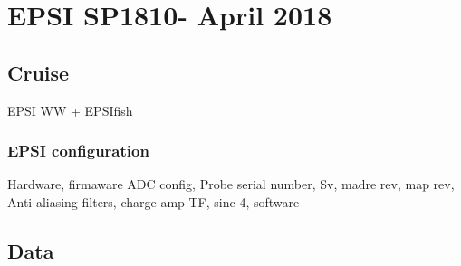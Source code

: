 \chapter{EPSI SP1810- April 2018}

\section{Cruise}
EPSI WW  + EPSIfish 
\subsection{EPSI configuration}
Hardware, firmaware
ADC config, Probe serial number, Sv, madre rev, map rev, Anti aliasing filters, charge amp TF, sinc 4, software


\section{Data}
